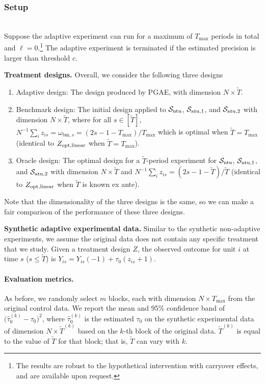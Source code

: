 \subsubsection{Setup}\label{subsec:sequential-setup}
\texttt{} \\
Suppose the adaptive experiment can run for a maximum of $T_{\max}$ periods in total and $\ell = 0$.\footnote{The results are robust to the hypothetical intervention with carryover effects, and are available upon request. } The adaptive experiment is terminated if the estimated precision is larger than threshold $c$. 

{\bf Treatment designs.} Overall, we consider the following three designs
\begin{enumerate}
    \item Adaptive design: The design produced by PGAE, with dimension $N \times \tilde{T}$.
    \item Benchmark design: The initial design applied to $\mathcal{S}_{\mathrm{ntu}}$, $\mathcal{S}_{\mathrm{atu},1}$, and $\mathcal{S}_{\mathrm{atu},2}$ with dimension $N \times \tilde{T}$,  where for all $s\in[\tilde{T}]$,  $N^{-1} \sum_i z_{is} = \omega_{\mathrm{bm},s} = (2s - 1 - T_{\max})/{T_{\max}}$ which is optimal when $\tilde{T} = T_{\max}$ (identical to $Z_{\textnormal{opt}, \mathrm{linear}}$ when $\tilde T = T_{\max}$). 
    \item Oracle design: The optimal design for a $\tilde{T}$-period experiment for $\mathcal{S}_{\mathrm{ntu}}$, $\mathcal{S}_{\mathrm{atu},1}$, and $\mathcal{S}_{\mathrm{atu},2}$ with dimension $N \times \tilde{T}$ and $N^{-1} \sum_i z_{is} = ({2s - 1- \tilde{T}})/{\tilde{T}}$ (identical to $Z_{\textnormal{opt}, \mathrm{linear}}$ when $\tilde{T}$ is known ex ante).
\end{enumerate}

Note that the dimensionality of the three designs is the same, so we can make a fair comparison of the performance of these three designs.

{\bf Synthetic adaptive experimental data.} Similar to the synthetic non-adaptive experiments, we assume the original data does not contain any specific treatment that we study. Given a treatment design $Z$, the observed outcome for unit $i$ at time $s$ ($s \leq \tilde{T}$) is $Y_{is} = Y_{is}(-1) +  \tau_0  (z_{is} + 1)$.

\paragraph{Evaluation metrics.} As before, we randomly select $m$ blocks, each with dimension $N \times T_{\max}$ from the original control data. We report the mean and 95\% confidence band of $\big( \hat{\tau}^{(k)}_{0} - \tau_0 \big)^2$, where $\hat{\tau}^{(k)}_{0}$ is the estimated $\tau_0$ on the synthetic experimental data of dimension $N \times \tilde{T}^{(k)}$ based on the $k$-th block of the original data. $\tilde{T}^{(k)}$ is equal to the value of $\tilde{T}$ for that block; that is, $\tilde{T}$ can vary with $k$. 

